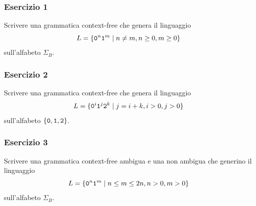 \begin{frame}
        \frametitle{Esercizio 1}
        Scrivere una grammatica context-free che genera il linguaggio
        \[
                L = \{ \mathtt{0}^{n} \mathtt{1}^{m} \; \vert \; n \neq m, n\ge 0, m\ge 0 \}
        \]
        sull'alfabeto $\Sigma_{B}$.
\end{frame}


\begin{frame}
        \frametitle{Esercizio 2}
        Scrivere una grammatica context-free che genera il linguaggio
        \[
                L = \{ \mathtt{0}^{i} \mathtt{1}^{j} \mathtt{2}^{k} \; \vert \; j = i + k, i>0, j>0 \}
        \]
        sull'alfabeto $\{\mathtt{0}, \mathtt{1}, \mathtt{2}\}$.
\end{frame}


\begin{frame}
        \frametitle{Esercizio 3}
        Scrivere una grammatica context-free ambigua e una non ambigua che generino il linguaggio
        \[
                L = \{ \mathtt{0}^{n} \mathtt{1}^{m} \; \vert \; n \le m \le 2n, n>0, m>0 \}
        \]
        sull'alfabeto $\Sigma_{B}$.

        \bigskip

\end{frame}




